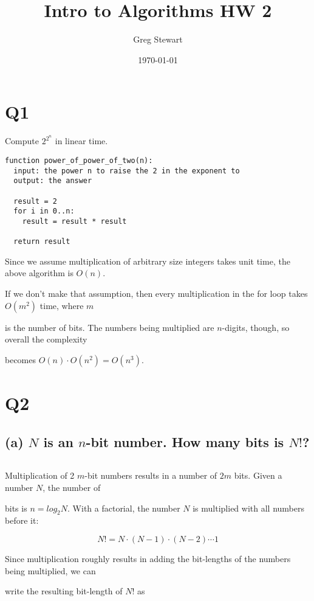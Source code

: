\documentclass{article}
\title{Intro to Algorithms HW 2}
\author{Greg Stewart}
\date{\today}
\begin{document}
\maketitle

\section*{Q1} Compute $2^{2^n}$ in linear time.

\begin{lstlisting}
function power_of_power_of_two(n):
  input: the power n to raise the 2 in the exponent to
  output: the answer

  result = 2
  for i in 0..n:
    result = result * result
  
  return result

\end{lstlisting}

Since we assume multiplication of arbitrary size integers takes unit time, the above algorithm is $O(n)$.

\smallskip

If we don't make that assumption, then every multiplication in the for loop takes $O(m^2)$ time, where $m$

is the number of bits. The numbers being multiplied are $n$-digits, though, so overall the complexity 

becomes $O(n) \cdot O(n^2) = O(n^3)$.

\section*{Q2} 

\subsection*{(a) \normalsize $N$ is an $n$-bit number. How many bits is $N!$?}

$ $

Multiplication of 2 $m$-bit numbers results in a number of $2m$ bits. Given a number $N$, the number of 

bits is $n = log_2{N}$. With a factorial, the number $N$ is multiplied with all numbers before it:

$$N! = N \cdot (N-1) \cdot (N-2) \cdots 1$$

Since multiplication roughly results in adding the bit-lengths of the numbers being multiplied, we can 

write the resulting bit-length of $N!$ as
\end{document}
